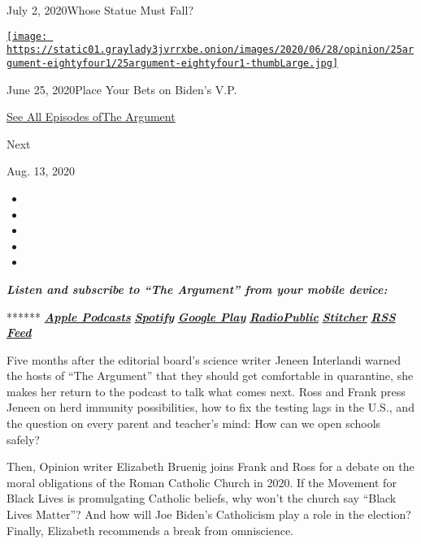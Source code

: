 July 2, 2020Whose Statue Must Fall?

\href{https://www.nytimes3xbfgragh.onion/2020/06/25/opinion/the-argument-biden-vice-president-supreme-court.html?action=click\&module=audio-series-bar\&region=header\&pgtype=Article}{\texttt{[image: https://static01.graylady3jvrrxbe.onion/images/2020/06/28/opinion/25argument-eightyfour1/25argument-eightyfour1-thumbLarge.jpg]}}

June 25, 2020Place Your Bets on Biden's V.P.

\href{https://www.nytimes3xbfgragh.onion/column/the-argument}{See All
Episodes ofThe Argument}

Next

Aug. 13, 2020

\begin{itemize}
\item
\item
\item
\item
\item
\end{itemize}

\emph{\textbf{Listen and subscribe to ``The Argument'' from your mobile
device:}}

******
\textbf{\href{https://itunes.apple.com/us/podcast/the-argument/id1438024613?mt=2}{\emph{Apple
Podcasts}}} \emph{\textbf{\textbar{}}}
\textbf{\href{https://open.spotify.com/show/6bmhSFLKtApYClEuSH8q42}{\emph{Spotify}}}
\emph{\textbf{\textbar{}}}
\textbf{\href{https://play.google.com/music/m/Idxib4hsg3yviao4gtym76knjjy?t=The_Argument}{\emph{Google
Play}}} \emph{\textbf{\textbar{}}}
\textbf{\href{https://radiopublic.com/the-argument-Wdbepr}{\emph{RadioPublic}}}
\emph{\textbf{\textbar{}}}
\textbf{\href{https://www.stitcher.com/podcast/the-new-york-times/the-argument}{\emph{Stitcher}}}
\emph{\textbf{\textbar{}}}
\textbf{\href{https://rss.art19.com/the-argument}{\emph{RSS Feed}}}

Five months after the editorial board's science writer Jeneen Interlandi
warned the hosts of ``The Argument'' that they should get comfortable in
quarantine, she makes her return to the podcast to talk what comes next.
Ross and Frank press Jeneen on herd immunity possibilities, how to fix
the testing lags in the U.S., and the question on every parent and
teacher's mind: How can we open schools safely?

Then, Opinion writer Elizabeth Bruenig joins Frank and Ross for a debate
on the moral obligations of the Roman Catholic Church in 2020. If the
Movement for Black Lives is promulgating Catholic beliefs, why won't the
church say ``Black Lives Matter''? And how will Joe Biden's Catholicism
play a role in the election? Finally, Elizabeth recommends a break from
omniscience.

